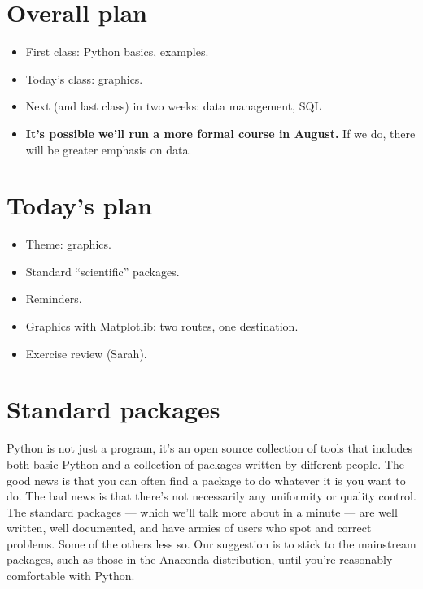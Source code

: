 \documentclass[11pt]{article}
\begin{document}
\section{Overall plan}

\begin{itemize}
\item First class:  Python basics, examples.
\item Today's class:  graphics.
\item Next (and last class) in two weeks:  data management, SQL
\item {\bf It's possible we'll run a more formal course in August.}
If we do, there will be greater emphasis on data.
\end{itemize}


\section{Today's plan}

\begin{itemize}
\item Theme:  graphics.
\item Standard ``scientific'' packages.
\item Reminders.
\item Graphics with Matplotlib: two routes, one destination.
\item Exercise review (Sarah).
\end{itemize}


\section{Standard packages}

Python is not just a program, it's an open source collection of tools
that includes both basic
Python and a collection of packages written by different people.
The good news is that you can often find a package to do whatever it is
you want to do.
The bad news is that there's not necessarily any uniformity or quality control.
The standard packages --- which we'll talk more about in a minute ---
are well written, well documented, and have armies of users who spot and correct
problems.
Some of the others less so.
Our suggestion is to stick to the mainstream packages, such as those in the
\href{http://docs.continuum.io/anaconda/pkg-docs.html}{Anaconda distribution},
until you're reasonably comfortable with Python.
\end{document}

